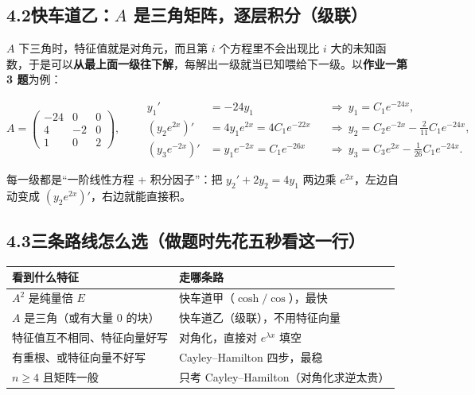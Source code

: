 \documentclass[11pt]{ctexart}
\begin{document}
\subsection*{4.2\quad 快车道乙：$A$ 是三角矩阵，逐层积分（级联）}

$A$ 下三角时，特征值就是对角元，而且第 $i$ 个方程里不会出现比 $i$ 大的未知函数，于是可以\textbf{从最上面一级往下解}，每解出一级就当已知喂给下一级。以\textbf{作业一第 3 题}为例：

\[
A=\begin{pmatrix}-24&0&0\\ 4&-2&0\\ 1&0&2\end{pmatrix},\qquad
\begin{aligned}
y_1'&=-24y_1 &&\Longrightarrow\ y_1=C_1e^{-24x},\\
\left(y_2e^{2x}\right)'&=4y_1e^{2x}=4C_1e^{-22x}
&&\Longrightarrow\ y_2=C_2e^{-2x}-\tfrac{2}{11}C_1e^{-24x},\\
\left(y_3e^{-2x}\right)'&=y_1e^{-2x}=C_1e^{-26x}
&&\Longrightarrow\ y_3=C_3e^{2x}-\tfrac{1}{26}C_1e^{-24x}.
\end{aligned}
\]

每一级都是“一阶线性方程 + 积分因子”：把 $y_2'+2y_2=4y_1$ 两边乘 $e^{2x}$，左边自动变成 $(y_2e^{2x})'$，右边就能直接积。

\subsection*{4.3\quad 三条路线怎么选（做题时先花五秒看这一行）}

\begin{center}
\small
\begin{tabular}{|>{\raggedright\arraybackslash}p{4.3cm}|>{\raggedright\arraybackslash}p{10.6cm}|}
\hline
\textbf{看到什么特征} & \textbf{走哪条路} \\ \hline
$A^2$ 是纯量倍 $E$ & 快车道甲（$\cosh/\cos$），最快 \\ \hline
$A$ 是三角（或有大量 0 的块） & 快车道乙（级联），不用特征向量 \\ \hline
特征值互不相同、特征向量好写 & 对角化，直接对 $e^{\lambda x}$ 填空 \\ \hline
有重根、或特征向量不好写 & Cayley--Hamilton 四步，最稳 \\ \hline
$n\ge 4$ 且矩阵一般 & 只考 Cayley--Hamilton（对角化求逆太贵） \\ \hline
\end{tabular}
\end{center}
\end{document}
